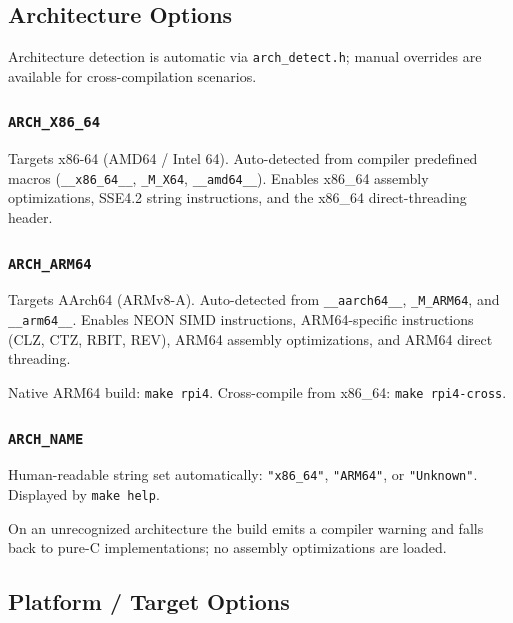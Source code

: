 \subsection{Architecture Options}
\label{sec:build-arch}

Architecture detection is automatic via \texttt{arch\_detect.h}; manual
overrides are available for cross-compilation scenarios.

\subsubsection{\texttt{ARCH\_X86\_64}}

Targets x86-64 (AMD64 / Intel 64). Auto-detected from compiler predefined
macros (\texttt{\_\_x86\_64\_\_}, \texttt{\_M\_X64}, \texttt{\_\_amd64\_\_}).
Enables x86\_64 assembly optimizations, SSE4.2 string instructions, and the
x86\_64 direct-threading header.

\subsubsection{\texttt{ARCH\_ARM64}}

Targets AArch64 (ARMv8-A). Auto-detected from \texttt{\_\_aarch64\_\_},
\texttt{\_M\_ARM64}, and \texttt{\_\_arm64\_\_}. Enables NEON SIMD instructions,
ARM64-specific instructions (CLZ, CTZ, RBIT, REV), ARM64 assembly
optimizations, and ARM64 direct threading.

Native ARM64 build: \texttt{make rpi4}. Cross-compile from x86\_64:
\texttt{make rpi4-cross}.

\subsubsection{\texttt{ARCH\_NAME}}

Human-readable string set automatically: \texttt{"x86\_64"}, \texttt{"ARM64"},
or \texttt{"Unknown"}. Displayed by \texttt{make help}.

On an unrecognized architecture the build emits a compiler warning and falls
back to pure-C implementations; no assembly optimizations are loaded.

\subsection{Platform / Target Options}
\label{sec:build-platform}

